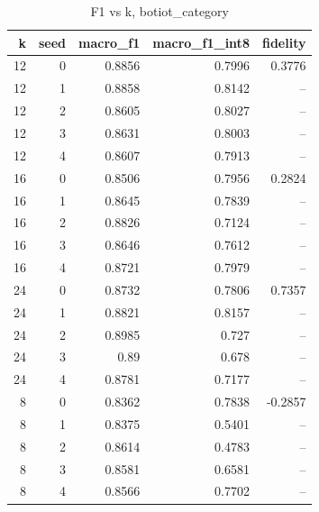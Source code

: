 \begin{table}
\caption{F1 vs k, botiot_category}
\begin{tabular}{rrrrr}
\toprule
k & seed & macro_f1 & macro_f1_int8 & fidelity \\
\midrule
12 & 0 & 0.8856 & 0.7996 & 0.3776 \\
12 & 1 & 0.8858 & 0.8142 & -- \\
12 & 2 & 0.8605 & 0.8027 & -- \\
12 & 3 & 0.8631 & 0.8003 & -- \\
12 & 4 & 0.8607 & 0.7913 & -- \\
16 & 0 & 0.8506 & 0.7956 & 0.2824 \\
16 & 1 & 0.8645 & 0.7839 & -- \\
16 & 2 & 0.8826 & 0.7124 & -- \\
16 & 3 & 0.8646 & 0.7612 & -- \\
16 & 4 & 0.8721 & 0.7979 & -- \\
24 & 0 & 0.8732 & 0.7806 & 0.7357 \\
24 & 1 & 0.8821 & 0.8157 & -- \\
24 & 2 & 0.8985 & 0.727 & -- \\
24 & 3 & 0.89 & 0.678 & -- \\
24 & 4 & 0.8781 & 0.7177 & -- \\
8 & 0 & 0.8362 & 0.7838 & -0.2857 \\
8 & 1 & 0.8375 & 0.5401 & -- \\
8 & 2 & 0.8614 & 0.4783 & -- \\
8 & 3 & 0.8581 & 0.6581 & -- \\
8 & 4 & 0.8566 & 0.7702 & -- \\
\bottomrule
\end{tabular}
\end{table}
